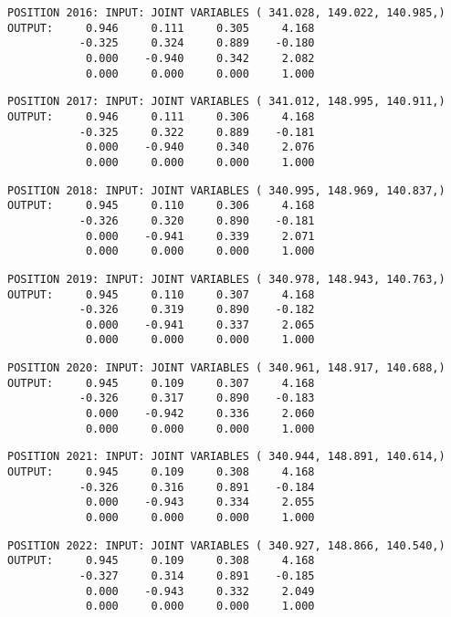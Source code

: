 \begin{verbatim}
POSITION 2016: INPUT: JOINT VARIABLES ( 341.028, 149.022, 140.985,)
OUTPUT:     0.946     0.111     0.305     4.168
           -0.325     0.324     0.889    -0.180
            0.000    -0.940     0.342     2.082
            0.000     0.000     0.000     1.000
\end{verbatim} \pagebreak[1]\begin{verbatim}
POSITION 2017: INPUT: JOINT VARIABLES ( 341.012, 148.995, 140.911,)
OUTPUT:     0.946     0.111     0.306     4.168
           -0.325     0.322     0.889    -0.181
            0.000    -0.940     0.340     2.076
            0.000     0.000     0.000     1.000
\end{verbatim} \pagebreak[1]\begin{verbatim}
POSITION 2018: INPUT: JOINT VARIABLES ( 340.995, 148.969, 140.837,)
OUTPUT:     0.945     0.110     0.306     4.168
           -0.326     0.320     0.890    -0.181
            0.000    -0.941     0.339     2.071
            0.000     0.000     0.000     1.000
\end{verbatim} \pagebreak[1]\begin{verbatim}
POSITION 2019: INPUT: JOINT VARIABLES ( 340.978, 148.943, 140.763,)
OUTPUT:     0.945     0.110     0.307     4.168
           -0.326     0.319     0.890    -0.182
            0.000    -0.941     0.337     2.065
            0.000     0.000     0.000     1.000
\end{verbatim} \pagebreak[1]\begin{verbatim}
POSITION 2020: INPUT: JOINT VARIABLES ( 340.961, 148.917, 140.688,)
OUTPUT:     0.945     0.109     0.307     4.168
           -0.326     0.317     0.890    -0.183
            0.000    -0.942     0.336     2.060
            0.000     0.000     0.000     1.000
\end{verbatim} \pagebreak[1]\begin{verbatim}
POSITION 2021: INPUT: JOINT VARIABLES ( 340.944, 148.891, 140.614,)
OUTPUT:     0.945     0.109     0.308     4.168
           -0.326     0.316     0.891    -0.184
            0.000    -0.943     0.334     2.055
            0.000     0.000     0.000     1.000
\end{verbatim} \pagebreak[1]\begin{verbatim}
POSITION 2022: INPUT: JOINT VARIABLES ( 340.927, 148.866, 140.540,)
OUTPUT:     0.945     0.109     0.308     4.168
           -0.327     0.314     0.891    -0.185
            0.000    -0.943     0.332     2.049
            0.000     0.000     0.000     1.000
\end{verbatim} \pagebreak[1]\begin{verbatim}

\end{verbatim}
